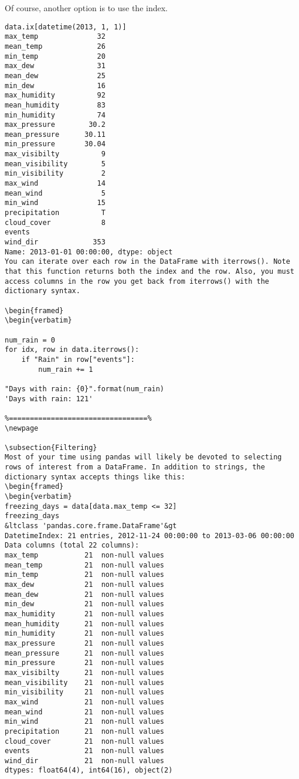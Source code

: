 Of course, another option is to use the index.
\begin{framed}
\begin{verbatim}
data.ix[datetime(2013, 1, 1)]
max_temp              32
mean_temp             26
min_temp              20
max_dew               31
mean_dew              25
min_dew               16
max_humidity          92
mean_humidity         83
min_humidity          74
max_pressure        30.2
mean_pressure      30.11
min_pressure       30.04
max_visibilty          9
mean_visibility        5
min_visibility         2
max_wind              14
mean_wind              5
min_wind              15
precipitation          T
cloud_cover            8
events                  
wind_dir             353
Name: 2013-01-01 00:00:00, dtype: object
You can iterate over each row in the DataFrame with iterrows(). Note that this function returns both the index and the row. Also, you must access columns in the row you get back from iterrows() with the dictionary syntax.

\begin{framed}
\begin{verbatim}

num_rain = 0
for idx, row in data.iterrows():
    if "Rain" in row["events"]:
        num_rain += 1

"Days with rain: {0}".format(num_rain)
'Days with rain: 121'

%=================================%
\newpage

\subsection{Filtering}
Most of your time using pandas will likely be devoted to selecting rows of interest from a DataFrame. In addition to strings, the dictionary syntax accepts things like this:
\begin{framed}
\begin{verbatim}
freezing_days = data[data.max_temp <= 32]
freezing_days
&ltclass 'pandas.core.frame.DataFrame'&gt
DatetimeIndex: 21 entries, 2012-11-24 00:00:00 to 2013-03-06 00:00:00
Data columns (total 22 columns):
max_temp           21  non-null values
mean_temp          21  non-null values
min_temp           21  non-null values
max_dew            21  non-null values
mean_dew           21  non-null values
min_dew            21  non-null values
max_humidity       21  non-null values
mean_humidity      21  non-null values
min_humidity       21  non-null values
max_pressure       21  non-null values
mean_pressure      21  non-null values
min_pressure       21  non-null values
max_visibilty      21  non-null values
mean_visibility    21  non-null values
min_visibility     21  non-null values
max_wind           21  non-null values
mean_wind          21  non-null values
min_wind           21  non-null values
precipitation      21  non-null values
cloud_cover        21  non-null values
events             21  non-null values
wind_dir           21  non-null values
dtypes: float64(4), int64(16), object(2)
\end{verbatim}
\end{framed}

